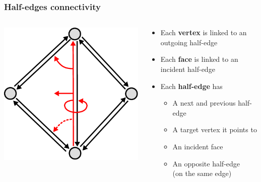 \begin{frame}
\frametitle{Half-edges connectivity}
\begin{columns}[c]
  \begin{column}{0.4\textwidth}
\includegraphics[width=\textwidth]{figures/halfedge-connectivity}
  \end{column}
  \begin{column}{0.6\textwidth}
\begin{itemize}
	\color{black}
	\item[\color{black}\textbullet] Each \textbf{vertex} is linked to an outgoing half-edge
	\item[\color{black}\textbullet] Each \textbf{face} is linked to an incident half-edge
	\item[\color{black}\textbullet] Each \textbf{half-edge} has \begin{itemize}
		\color{black}
		\item[\color{black}\textbullet] A next and previous half-edge
		\item[\color{black}\textbullet] A target vertex it points to
		\item[\color{black}\textbullet] An incident face
		\item[\color{black}\textbullet] An opposite half-edge\\(on the same edge)
	\end{itemize}
\end{itemize}
  \end{column}
\end{columns}
\end{frame}

